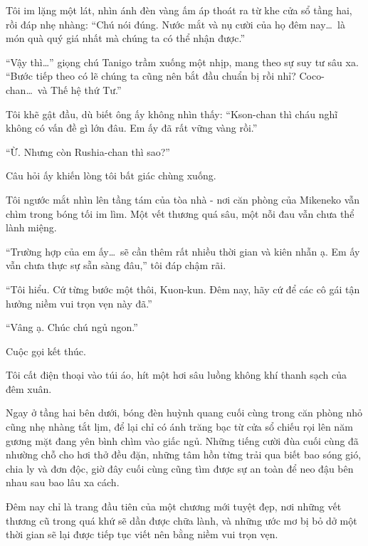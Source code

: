 \documentclass[../main.tex]{subfiles}
\begin{document}
Tôi im lặng một lát, nhìn ánh đèn vàng ấm áp thoát ra từ khe cửa sổ tầng hai, rồi đáp nhẹ nhàng: ``Chú nói đúng. Nước mắt và nụ cười của họ đêm nay\dots\ là món quà quý giá nhất mà chúng ta có thể nhận được.''

``Vậy thì\dots'' giọng chú Tanigo trầm xuống một nhịp, mang theo sự suy tư sâu xa. ``Bước tiếp theo có lẽ chúng ta cũng nên bắt đầu chuẩn bị rồi nhỉ? Coco-chan\dots\ và Thế hệ thứ Tư.''

Tôi khẽ gật đầu, dù biết ông ấy không nhìn thấy: ``Kson-chan thì cháu nghĩ không có vấn đề gì lớn đâu. Em ấy đã rất vững vàng rồi.''

``Ừ. Nhưng còn Rushia-chan thì sao?''

Câu hỏi ấy khiến lòng tôi bất giác chùng xuống.

Tôi ngước mắt nhìn lên tầng tám của tòa nhà - nơi căn phòng của Mikeneko vẫn chìm trong bóng tối im lìm. Một vết thương quá sâu, một nỗi đau vẫn chưa thể lành miệng.

``Trường hợp của em ấy\dots\ sẽ cần thêm rất nhiều thời gian và kiên nhẫn ạ. Em ấy vẫn chưa thực sự sẵn sàng đâu,'' tôi đáp chậm rãi.

``Tôi hiểu. Cứ từng bước một thôi, Kuon-kun. Đêm nay, hãy cứ để các cô gái tận hưởng niềm vui trọn vẹn này đã.''

``Vâng ạ. Chúc chú ngủ ngon.''

Cuộc gọi kết thúc.

Tôi cất điện thoại vào túi áo, hít một hơi sâu luồng không khí thanh sạch của đêm xuân.

Ngay ở tầng hai bên dưới, bóng đèn huỳnh quang cuối cùng trong căn phòng nhỏ cũng nhẹ nhàng tắt lịm, để lại chỉ có ánh trăng bạc từ cửa sổ chiếu rọi lên năm gương mặt đang yên bình chìm vào giấc ngủ. Những tiếng cười đùa cuối cùng đã nhường chỗ cho hơi thở đều đặn, những tâm hồn từng trải qua biết bao sóng gió, chia ly và đơn độc, giờ đây cuối cùng cũng tìm được sự an toàn để neo đậu bên nhau sau bao lâu xa cách.

Đêm nay chỉ là trang đầu tiên của một chương mới tuyệt đẹp, nơi những vết thương cũ trong quá khứ sẽ dần được chữa lành, và những ước mơ bị bỏ dở một thời gian sẽ lại được tiếp tục viết nên bằng niềm vui trọn vẹn.
\end{document}
